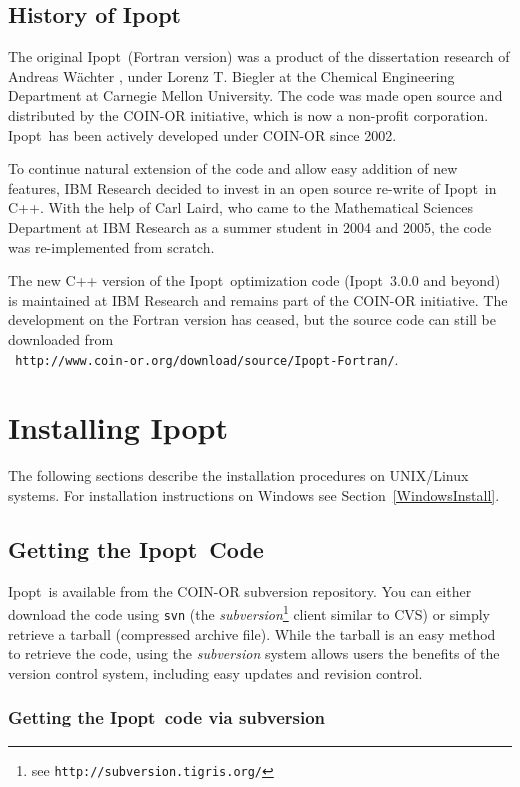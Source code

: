 \documentclass[10pt]{article}
\newcommand{\Ipopt}{{\sc Ipopt}}
\begin{document}
\subsection{History of \Ipopt}
The original \Ipopt\ (Fortran version) was a product of the dissertation
research of Andreas W\"achter \cite{WaechterPhD}, under Lorenz
T. Biegler at the Chemical Engineering Department at Carnegie Mellon
University. The code was made open source and distributed by the
COIN-OR initiative, which is now a non-profit corporation.  \Ipopt\ has
been actively developed under COIN-OR since 2002.

To continue natural extension of the code and allow easy addition of
new features, IBM Research decided to invest in an open source
re-write of \Ipopt\ in C++.  With the help of Carl Laird, who came to
the Mathematical Sciences Department at IBM Research as a summer
student in 2004 and 2005, the code was re-implemented from
scratch.

The new C++ version of the \Ipopt\ optimization code (\Ipopt\ 3.0.0
and beyond) is maintained at IBM Research and remains part of the
COIN-OR initiative. The development on the Fortran version has
ceased, but the source code can still be downloaded from\\ {\tt
  http://www.coin-or.org/download/source/Ipopt-Fortran/}.

\section{Installing \Ipopt}\label{Installing}

The following sections describe the installation procedures on
UNIX/Linux systems.  For installation instructions on Windows
see Section~\ref{WindowsInstall}.

\subsection{Getting the \Ipopt\ Code}
\Ipopt\ is available from the COIN-OR subversion repository. You can
either download the code using \texttt{svn} (the
\textit{subversion}\footnote{see
  \texttt{http://subversion.tigris.org/}} client similar to CVS) or
simply retrieve a tarball (compressed archive file).  While the
tarball is an easy method to retrieve the code, using the
\textit{subversion} system allows users the benefits of the version
control system, including easy updates and revision control.

\subsubsection{Getting the \Ipopt\ code via subversion}
\end{document}
